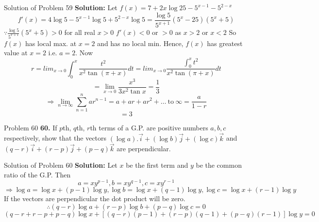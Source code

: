 \documentclass[aspectratio=1610,8pt]{beamer}
\begin{document}
\begin{frame}{Solution of Problem 59}
  \textbf{Solution:} Let $f(x) = 7 + 2x\log 25 - 5^{x - 1} -5^{2 - x}$
  $$f'(x) = 4\log 5 - 5^{x - 1}\log 5 + 5^{2 - x}\log 5 = \frac{\log 5}{5^{x + 1}}(5^x - 25)(5^x + 5)$$
  $\because \frac{\log 5}{5^{x + 1}}(5^x + 5) > 0$ for all real $x > 0$
  \linebreak\linebreak
  $f'(x) < 0$ or $> 0$ as $x > 2$ or $x < 2$
  \linebreak\linebreak
  So $f(x)$ has local max. at $x = 2$ and has no local min. Hence, $f(x)$ has greatest value at $x = 2$ i.e. $a = 2.$ Now
  $$r = lim_{x\to 0}\int_{0}^x\frac{t^2}{x^2\tan(\pi + x)}dt = lim_{x\to 0}\frac{\int_{0}^xt^2}{x^2\tan(\pi + x)}dt$$
  $$= \lim_{x\to 0}\frac{x^3}{3x^2\tan x} = \frac{1}{3}$$
  $$\Rightarrow \lim_{n \to \infty}\sum_{n = 1}^nar^{n - 1} = a + ar + ar^2 + \ldots~\text{to}~\infty = \frac{a}{1 - r}$$
  $$= 3$$
\end{frame}
\begin{frame}{Problem 60}
  \textbf{60.} If $p$th, $q$th, $r$th terms of a G.P. are positive numbers $a, b, c$ respectively, show that the vectors $(\log
  a).\vec{i} + (\log b)\vec{j} + (\log c)\vec{k}$ and $(q - r)\vec{i} + (r - p)\vec{j} + (p - q)\vec{k}$ are perpendicular.
\end{frame}
\begin{frame}{Solution of Problem 60}
  \textbf{Solution:} Let $x$ be the first term and $y$ be the common ratio of the G.P. Then
  $$a = xy^{p - 1}, b = xy^{q - 1}, c = xy^{r - 1}$$
  $$\Rightarrow \log a = \log x + (p - 1)\log y, \log b = \log x + (q - 1)\log y, \log c = \log x + (r - 1)\log y$$
  If the vectors are perpendicular the dot product will be zero.
  $$\therefore (q - r)\log a + (r - p)\log b + (p - q)\log c = 0$$
  $$(q - r + r - p + p - q)\log x + [(q - r)(p - 1) + (r - p)(q - 1) + (p - q)(r - 1)]\log y = 0$$
\end{frame}
\end{document}
